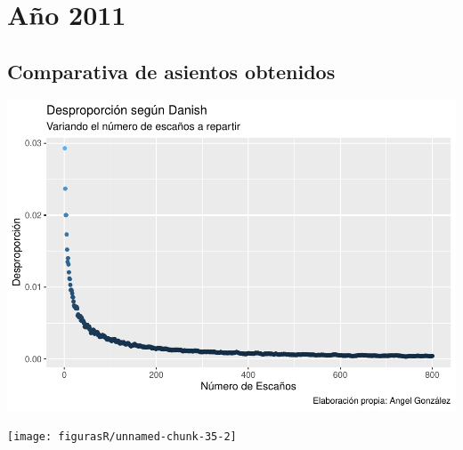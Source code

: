 \documentclass[12pt,a4paper,]{book}
\numberwithin{dummy}{section}
\theoremstyle{ocrenumbox}
\theoremstyle{blacknumex}
\theoremstyle{blacknumbox}
\theoremstyle{ocrenum}
\theoremstyle{ocrenum}
\begin{document}
\hypertarget{auxf1o-2011}{%
\section{Año 2011}\label{auxf1o-2011}}

\hypertarget{comparativa-de-asientos-obtenidos-10}{%
\subsection{Comparativa de asientos
obtenidos}\label{comparativa-de-asientos-obtenidos-10}}

\begin{center}\includegraphics[width=1\linewidth]{figurasR/unnamed-chunk-35-1} \end{center}

\begin{center}\texttt{[image: figurasR/unnamed-chunk-35-2]} \end{center}
\end{document}

